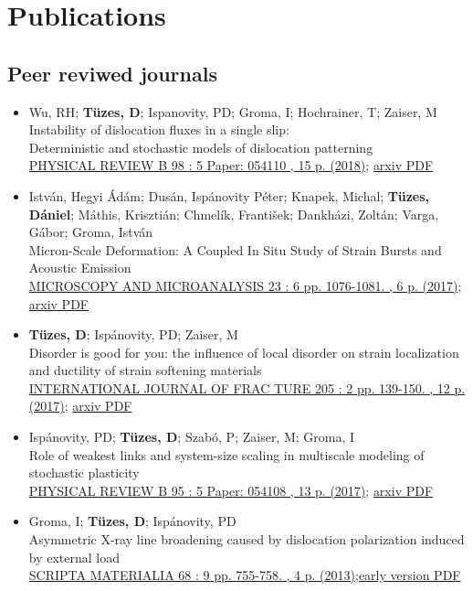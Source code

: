 \documentclass[11pt,a4paper,sans]{moderncv}        %
\begin{document}
\section{Publications}
\subsection{Peer reviwed journals}
\begin{itemize}
\item Wu, RH; \textbf{Tüzes, D}; Ispanovity, PD; Groma, I; Hochrainer, T; Zaiser, M\\
	Instability of dislocation fluxes in a single slip:\\
	Deterministic and stochastic models of dislocation patterning\\
    \href{https://journals.aps.org/prb/abstract/10.1103/PhysRevB.98.054110}{PHYSICAL REVIEW B 98 : 5 Paper: 054110 , 15 p. (2018)};
    \href{https://arxiv.org/pdf/1708.05533}{arxiv PDF}
\item István, Hegyi Ádám; Dusán, Ispánovity Péter; Knapek, Michal; \textbf{Tüzes, Dániel}; Máthis, Krisztián; Chmelík, František; Dankházi, Zoltán; Varga, Gábor; Groma, István\\
    Micron-Scale Deformation: A Coupled In Situ Study of Strain Bursts and Acoustic Emission\\
    \href{https://www.cambridge.org/core/journals/microscopy-and-microanalysis/article/micronscale-deformation-a-coupled-in-situ-study-of-strain-bursts-and-acoustic-emission/DAF84F7E4CC7C2A211E39A1FFBCCB2D0}{MICROSCOPY AND MICROANALYSIS 23 : 6 pp. 1076-1081. , 6 p. (2017)};
    \href{https://arxiv.org/pdf/1604.01815}{arxiv PDF}
\item \textbf{Tüzes, D}; Ispánovity, PD; Zaiser, M\\
    Disorder is good for you: the influence of local disorder on strain localization and ductility of strain softening materials\\
    \href{https://link.springer.com/article/10.1007\%2Fs10704-017-0187-1}{INTERNATIONAL JOURNAL OF FRAC	TURE 205 : 2 pp. 139-150. , 12 p. (2017)};
    \href{https://arxiv.org/pdf/1604.01821}{arxiv PDF}
\item Ispánovity, PD; \textbf{Tüzes, D}; Szabó, P; Zaiser, M; Groma, I\\
    Role of weakest links and system-size scaling in multiscale modeling of stochastic plasticity\\
    \href{https://journals.aps.org/prb/abstract/10.1103/PhysRevB.95.054108}{PHYSICAL REVIEW B 95 : 5 Paper: 054108 , 13 p. (2017)};
    \href{https://arxiv.org/pdf/1604.01645}{arxiv PDF}
\item Groma, I; \textbf{Tüzes, D}; Ispánovity, PD\\
    Asymmetric X-ray line broadening caused by dislocation polarization induced by external load\\
    \href{https://www.sciencedirect.com/science/article/pii/S1359646213000110}{SCRIPTA MATERIALIA 68 : 9 pp. 755-758. , 4 p. (2013)};\href{http://metal.elte.hu/~tuzes/docs/pre\%20AsymmetricX-ray\%20line\%20broadening\%20caused\%20by\%20dislocation\%20polarization\%20induced\%20by\%20external\%20load.pdf}{early version PDF}
\end{itemize}
    
\end{document}
